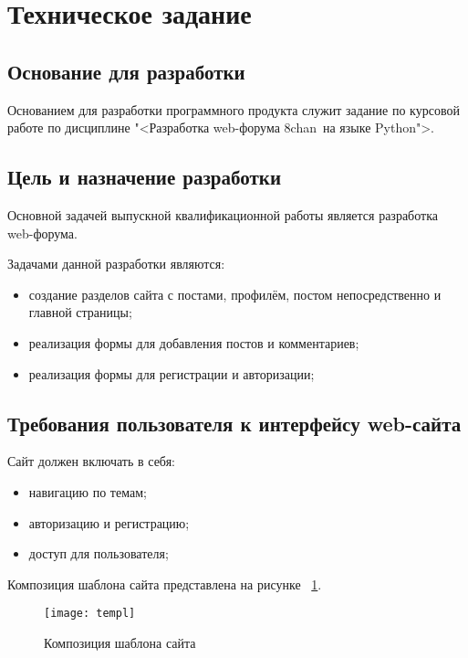 \section{Техническое задание}
\subsection{Основание для разработки}

Основанием для разработки программного продукта служит задание по курсовой работе по дисциплине  "<Разработка web-форума \textquotedbl 8chan\textquotedbl\ на языке Python">.

\subsection{Цель и назначение разработки}

Основной задачей выпускной квалификационной работы является разработка web-форума.

Задачами данной разработки являются:
\begin{itemize}
\item создание разделов сайта с постами, профилём, постом непосредственно и главной страницы;
\item реализация формы для добавления постов и комментариев;
\item реализация формы для регистрации и авторизации;
\end{itemize}

\subsection{Требования пользователя к интерфейсу web-сайта}

Сайт должен включать в себя:
\begin{itemize}
    \item навигацию по темам;
    \item авторизацию и регистрацию;
    \item доступ для пользователя;
\end{itemize}

Композиция шаблона сайта представлена на рисунке ~\ref{templ:image}.

\begin{figure}[ht]
\texttt{[image: templ]}
\caption{Композиция шаблона сайта}
\label{templ:image}
\end{figure}

